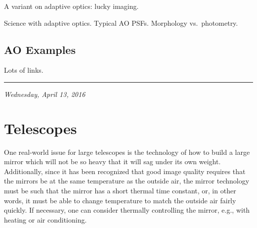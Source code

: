 \documentclass[12pt]{article}
\begin{document}
A variant on adaptive optics: lucky imaging.

Science with adaptive optics. Typical AO PSFs. Morphology vs.\ photometry.

\subsection{AO Examples}
Lots of links.

\rule{\textwidth}{0.4pt}

{\small\hfill\emph{Wednesday, April 13, 2016}}
\section{Telescopes}
One real-world issue for large telescopes is the technology of how to
build a large mirror which will not be so heavy that it will sag under
its own weight. Additionally, since it has been recognized that good
image quality requires that the mirrors be at the same temperature as
the outside air, the mirror technology must be such that the mirror
has a short thermal time constant, or, in other words, it must be able
to change temperature to match the outside air fairly quickly. If
necessary, one can consider thermally controlling the mirror, e.g.,
with heating or air conditioning.
\end{document}
